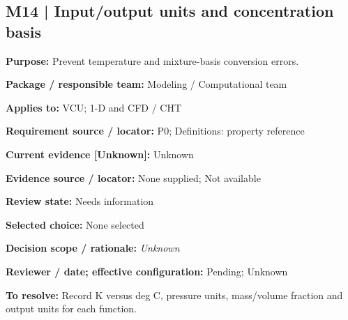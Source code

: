 \documentclass[11pt]{article}
\begin{document}
\par\noindent\begin{minipage}{\textwidth}\small\setlength{\parskip}{2pt}
\subsection*{M14 | Input/output units and concentration basis}
\textbf{Purpose:} Prevent temperature and mixture-basis conversion errors.\par
\textbf{Package / responsible team:} Modeling / Computational team\par
\textbf{Applies to:} VCU; 1-D and CFD / CHT\par
\textbf{Requirement source / locator:} P0; Definitions: property reference\par
\textbf{Current evidence [Unknown]:} Unknown\par
\textbf{Evidence source / locator:} None supplied; Not available\par
\textbf{Review state:} Needs information\par
\textbf{Selected choice:} None selected\par
\textbf{Decision scope / rationale:} \textit{Unknown}\par
\textbf{Reviewer / date; effective configuration:} Pending; Unknown\par
\textbf{To resolve:} Record K versus deg C, pressure units, mass/volume fraction and output units for each function.\par
\end{minipage}\par\vspace{5pt}
\end{document}
